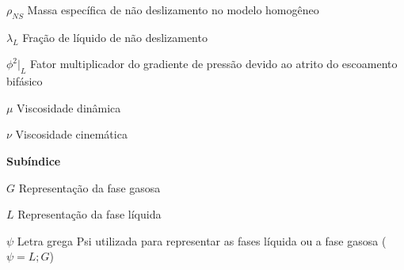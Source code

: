 \begin{simbolos}
   \item[$\rho_{NS}$] Massa específica de não deslizamento no modelo homogêneo \space [$kg/m^3$] 
   \item[$\lambda_{L}$] Fração de líquido de não deslizamento \space [-]
   \item[$\phi^2|_{L}$ ] Fator multiplicador do gradiente de pressão devido ao atrito do escoamento bifásico \space [-]
   \item[$\mu$] Viscosidade dinâmica \space [$Pa\,s$]
   \item[$\nu$] Viscosidade cinemática \space [$cm^2/s$]
   
   \item[\textbf{Subíndice}]
   
   \item[$G$] Representação da fase gasosa 
   \item[$L$] Representação da fase líquida
   \item[$\psi$] Letra grega Psi utilizada para representar as fases líquida ou
   a fase gasosa ($\psi=L;G$)
   
\end{simbolos}